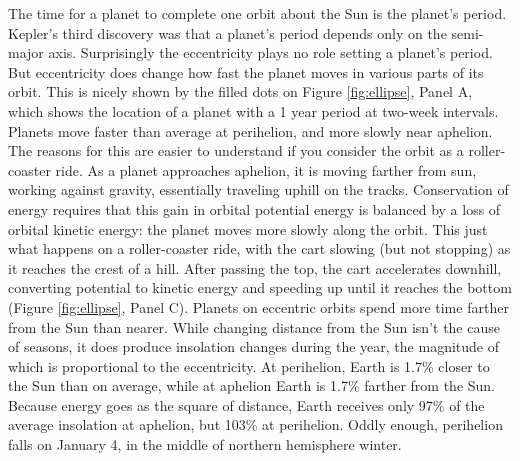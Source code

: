 \documentclass[amstex,12pt]{book}
\begin{document}
The time for a planet to complete one orbit about the Sun is the planet's period. Kepler's third discovery was that a planet's period depends only on the semi-major axis. Surprisingly the eccentricity plays no role setting a planet's period. But eccentricity does change how fast the planet moves in various parts of its orbit.  This is nicely shown by the filled dots on Figure \ref{fig:ellipse}, Panel A, which shows the location of a planet with a 1 year period at two-week intervals. Planets move faster than average at perihelion, and more slowly near aphelion. The reasons for this are easier to understand if you consider the orbit as a roller-coaster ride. As a planet approaches aphelion, it is moving farther from sun, working against gravity, essentially traveling uphill on the tracks. Conservation of energy requires that this gain in orbital potential energy is balanced by a loss of orbital kinetic energy: the planet moves more slowly along the orbit. This just what happens on a roller-coaster ride, with the cart slowing (but not stopping) as it reaches the crest of a hill. After passing the top, the cart accelerates downhill, converting potential to kinetic energy and speeding up until it reaches the bottom (Figure \ref{fig:ellipse}, Panel C). Planets on eccentric orbits spend more time farther from the Sun than nearer. While changing distance from the Sun isn't the cause of seasons, it does produce insolation changes during the year, the magnitude of which is proportional to the eccentricity.  At perihelion, Earth is 1.7\% closer to the Sun than on average, while at aphelion Earth is 1.7\% farther from the Sun. Because energy goes as the square of distance, Earth receives only 97\% of the average insolation at aphelion, but 103\%  at perihelion. Oddly enough, perihelion falls on January 4, in the middle of northern hemisphere winter.\\
\end{document}
